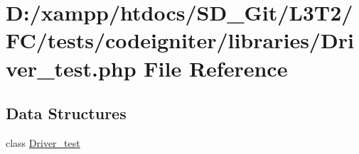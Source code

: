 \hypertarget{_driver__test_8php}{}\section{D\+:/xampp/htdocs/\+S\+D\+\_\+\+Git/\+L3\+T2/\+F\+C/tests/codeigniter/libraries/\+Driver\+\_\+test.php File Reference}
\label{_driver__test_8php}
\subsection*{Data Structures}
\begin{DoxyCompactItemize}
\item 
class \hyperlink{class_driver__test}{Driver\+\_\+test}
\end{DoxyCompactItemize}
